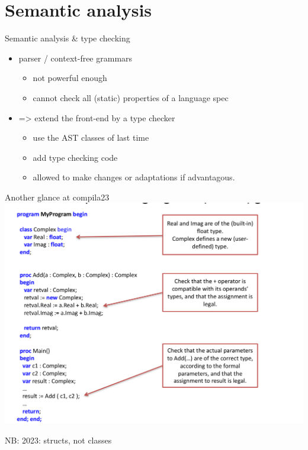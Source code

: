 \documentclass{beamer}
\begin{document}
\section{Semantic analysis}
\label{sec:orgee9a274}
\begin{frame}[label={sec:orgea69d43}]{Semantic analysis \& type checking}
\begin{itemize}
\item parser / context-free  grammars 
\begin{itemize}
\item not powerful enough
\item cannot check all (static) properties of a language spec
\end{itemize}

\item => extend the front-end by a type checker

\begin{itemize}
\item use the AST classes of last time
\item add type checking code
\item allowed to make \alert{changes} or adaptations if advantagous.
\end{itemize}
\end{itemize}
\end{frame}
\begin{frame}[label={sec:orge8a61cd}]{Another glance at compila23}
\includegraphics[width=\textwidth]{figures/snaps/compilaexample-checking}


NB: 2023: structs, not classes 
\end{frame}
\end{document}
